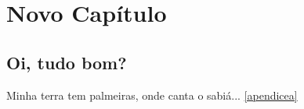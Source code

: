 %
%
%
%
\chapter{Novo Capítulo}

\section{Oi, tudo bom?}

Minha terra tem palmeiras, onde canta o sabiá... \autoref{apendicea}
